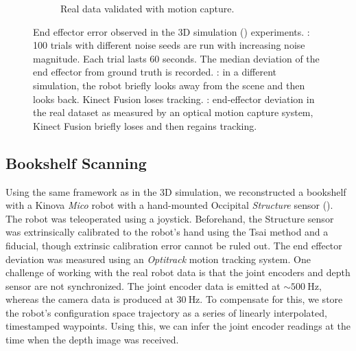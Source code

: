 \begin{figure}[ht]
\begin{subfigure}{0.5\columnwidth}
	\caption{Real data validated with motion capture.}
	\label{fig:motion_track} 
\end{subfigure} 
\caption{End effector error observed in the 3D simulation () experiments. : 100 trials with different noise seeds are run with increasing noise magnitude. Each trial lasts 60 seconds. The median deviation of the end effector from ground truth is recorded. : in a different simulation, the robot briefly looks away from the scene and then looks back. Kinect Fusion loses tracking. : end-effector deviation in the real dataset as measured by an optical motion capture system, Kinect Fusion briefly loses and then regains tracking.}
\label{fig:3d_experiment_data} 
\end{figure}

\subsection{Bookshelf Scanning}
\label{sec:3d_real}

Using the same framework as in the 3D simulation, we reconstructed a bookshelf with a Kinova \textit{Mico} robot with a hand-mounted Occipital \textit{Structure} sensor (). The robot was teleoperated using a joystick. Beforehand, the Structure sensor was extrinsically calibrated to the robot's hand using the Tsai\cite{Gupta11cameracalibration} method and a fiducial, though extrinsic calibration error cannot be ruled out. The end effector deviation was measured using an \textit{Optitrack} motion tracking system. One challenge of working with the real robot data is that the joint encoders and depth sensor are not synchronized. The joint encoder data is emitted at $\sim 500~\text{Hz}$, whereas the camera data is produced at $30~\text{Hz}$. To compensate for this, we store the robot's configuration space trajectory as a series of linearly interpolated, timestamped waypoints. Using this, we can infer the joint encoder readings at the time when the depth image was received. 


